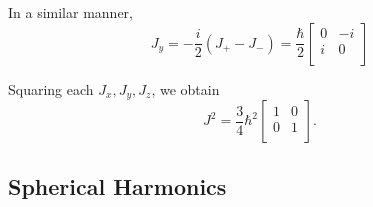 \documentclass[phys334]{subfiles}
\begin{document}
\begin{example}{}
        In a similar manner,
        \begin{equation*}
            J_y = -\frac{i}{2}\left( J_+-J_- \right) = \frac{\hbar}{2}
            \begin{bmatrix}
            	0 & -i \\
            	i & 0 \\
            \end{bmatrix}
        \end{equation*}

        Squaring each $J_x,J_y,J_z$, we obtain
        \begin{equation*}
            J^{2} = \frac{3}{4}\hbar^{2}
            \begin{bmatrix}
            	1 & 0 \\
            	0 & 1 \\
            \end{bmatrix}.
        \end{equation*}
    \end{example}
    
    \rruleline

    \subsection{Spherical Harmonics}
\end{document}
